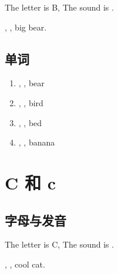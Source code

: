 The letter is B, The sound is .

, , big bear.


\subsection{单词}

\begin{enumerate}
  \item {}, , bear
  \item {}, , bird
  \item {}, , bed
  \item {}, , banana
\end{enumerate}




\section{C 和 c}

\subsection{字母与发音}

The letter is C, The sound is .

, , cool cat.


